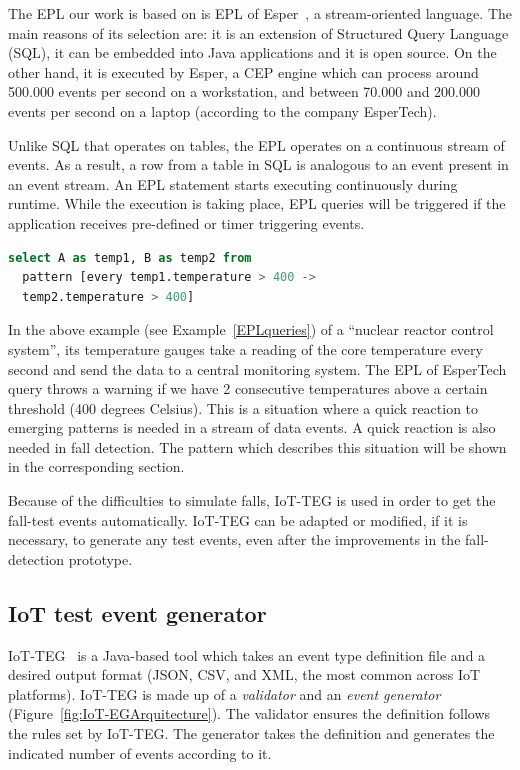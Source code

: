 \documentclass[journal]{IEEEtran}
\begin{document}
The EPL our work is based on is EPL of Esper~\cite{Esper:2016}, a stream-oriented language. The main reasons of its selection are: 
it is an extension of Structured Query Language (SQL), it can be embedded into Java applications and it is open source. On the other hand, it is executed by Esper, a
CEP engine which can process around 500.000 events per second on a workstation, and between 70.000 and 200.000 events per second on a laptop (according to 
the company EsperTech).
 
Unlike SQL that operates on tables, the EPL operates on a continuous stream of events. As a 
result, a row from a table in SQL is analogous to an event present in an event stream. An EPL statement starts executing continuously during 
runtime. While the execution is taking place, EPL queries will be triggered if the application receives pre-defined or timer triggering events.
 
 \renewcommand{\lstlistingname}{Example}
 
 \begin{lstlisting}[basicstyle=\ttfamily\scriptsize,language=SQL,caption=EPL of EsperTech query example,label=EPLqueries]
select A as temp1, B as temp2 from 
  pattern [every temp1.temperature > 400 -> 
  temp2.temperature > 400]
 \end{lstlisting}
 
In the above example (see Example~\ref{EPLqueries}) of a ``nuclear
reactor control system'', its temperature gauges take a reading of the core temperature every second and send the data 
to a central monitoring system. The EPL of EsperTech query throws a warning if we have 2 consecutive 
temperatures above a certain threshold (400 degrees Celsius). This is a situation where a quick reaction to emerging patterns 
is needed in a stream of data events. A quick reaction is also needed in fall detection. The pattern which 
describes this situation will be shown in the corresponding section.
 
Because of the difficulties to simulate falls, IoT-TEG is used in
order to get the fall-test events automatically. 
IoT-TEG can be adapted or modified, if it is necessary, to generate any test events, even after the improvements 
in the fall-detection prototype.

\subsection{IoT test event generator}
\label{iotteg}

IoT-TEG~\cite{TesisGutierrez2017,Gutierrez2017} is a Java-based tool which takes an event 
type definition file and a desired output format (JSON, CSV, and XML, the most common across 
IoT platforms). IoT-TEG is made up of a \emph{validator} and an \emph{event generator} 
(Figure~\ref{fig:IoT-EGArquitecture}). The validator ensures the definition follows the rules set 
by IoT-TEG. The generator takes the definition and generates the indicated number of events according to it.
\end{document}
